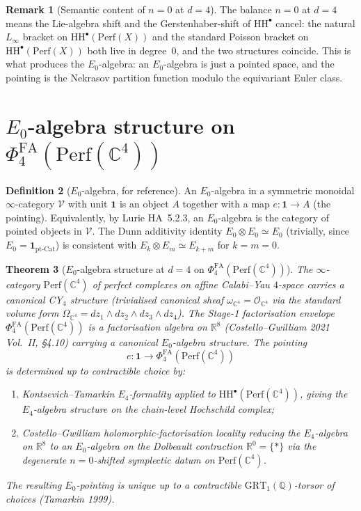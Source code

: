 \documentclass[11pt]{article}
\providecommand{\C}{\mathbb{C}}
\providecommand{\R}{\mathbb{R}}
\providecommand{\cO}{\mathcal{O}}
\providecommand{\Perf}{\mathrm{Perf}}
\providecommand{\Efour}{E_4}
\providecommand{\Ezero}{E_0}
\providecommand{\HH}{\mathrm{HH}}
\providecommand{\PhiFA}{\Phi^{\mathrm{FA}}}
\newtheorem{theorem}{Theorem}[section]
\theoremstyle{definition}
\newtheorem{definition}[theorem]{Definition}
\newtheorem{remark}[theorem]{Remark}
\begin{document}
\begin{remark}[Semantic content of $n = 0$ at $d = 4$]
\label{rem:balance-d4}
The balance $n = 0$ at $d = 4$ means the Lie-algebra shift and
the Gerstenhaber-shift of $\HH^\bullet$ cancel: the natural $L_\infty$
bracket on $\HH^\bullet(\Perf(X))$ and the standard Poisson bracket on
$\HH^\bullet(\Perf(X))$ both live in degree~$0$, and the two structures
coincide. This is what produces the $\Ezero$-algebra:
an $\Ezero$-algebra is just a pointed space, and the pointing is the
Nekrasov partition function modulo the equivariant Euler class.
\end{remark}

\section{$\Ezero$-algebra structure on $\PhiFA_4(\Perf(\C^4))$}
\label{sec:E0-structure}

\begin{definition}[$\Ezero$-algebra, for reference]
\label{def:E0}
An $\Ezero$-algebra in a symmetric monoidal $\infty$-category $\mathcal{V}$
with unit $\mathbf{1}$ is an object $A$ together with a map
$e : \mathbf{1} \to A$ (the pointing). Equivalently, by Lurie HA~5.2.3,
an $\Ezero$-algebra is the category of pointed objects in $\mathcal{V}$.
The Dunn additivity identity
$\Ezero \otimes \Ezero \simeq \Ezero$
(trivially, since $\Ezero = \mathbf{1}_{\text{pt-Cat}}$)
is consistent with $E_k \otimes E_m \simeq E_{k+m}$
for $k = m = 0$.
\end{definition}

\begin{theorem}[$\Ezero$-algebra structure at $d = 4$ on $\PhiFA_4(\Perf(\C^4))$]
\label{thm:mag-four-E0-structure}
The $\infty$-category $\Perf(\C^4)$ of perfect complexes on affine
Calabi--Yau $4$-space carries a canonical CY$_4$ structure (trivialised
canonical sheaf $\omega_{\C^4} = \cO_{\C^4}$ via the standard volume
form $\Omega_{\C^4} = dz_1 \wedge dz_2 \wedge dz_3 \wedge dz_4$). The Stage-1
factorisation envelope $\PhiFA_4(\Perf(\C^4))$ is a factorisation algebra
on $\R^8$ (Costello--Gwilliam 2021 Vol.~II, \S 4.10) carrying a canonical
$\Ezero$-algebra structure. The pointing
\[
  e : \mathbf{1} \longrightarrow \PhiFA_4(\Perf(\C^4))
\]
is determined up to contractible choice by:
\begin{enumerate}[label=(\alph*)]
  \item \emph{Kontsevich--Tamarkin $E_4$-formality} applied to
  $\HH^\bullet(\Perf(\C^4))$,
  giving the $\Efour$-algebra structure on the chain-level Hochschild
  complex;
  \item \emph{Costello--Gwilliam holomorphic-factorisation locality}
  reducing the $\Efour$-algebra on $\R^8$ to an $\Ezero$-algebra
  on the Dolbeault contraction $\R^0 = \{*\}$ via the degenerate
  $n = 0$-shifted symplectic datum on $\Perf(\C^4)$.
\end{enumerate}
The resulting $\Ezero$-pointing is unique up to a contractible
$\mathrm{GRT}_1(\mathbb{Q})$-torsor of choices (Tamarkin 1999).
\end{theorem}
\end{document}
